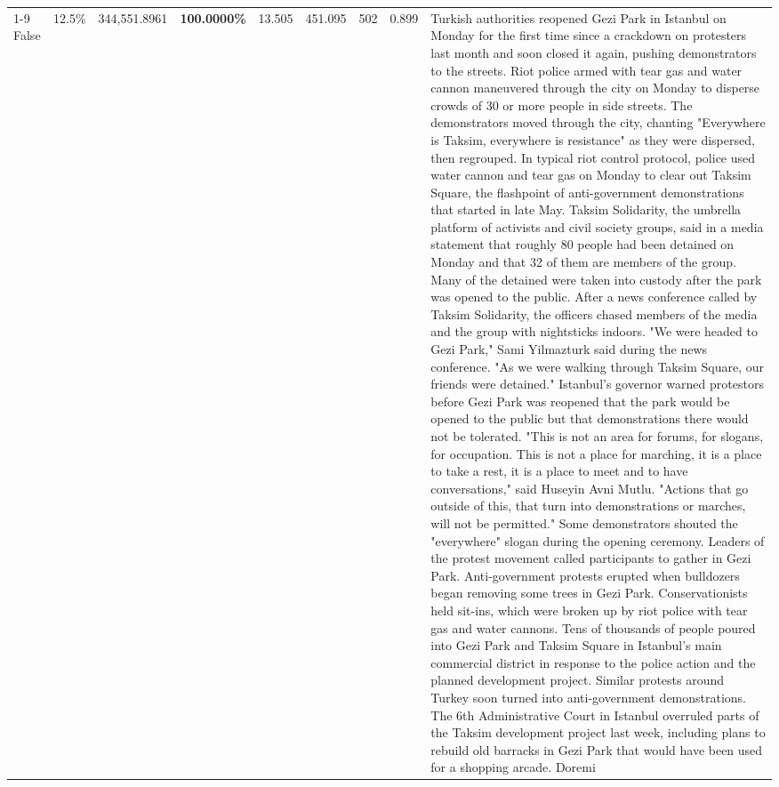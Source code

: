 \begin{table}[H]
\begin{tabular}{lllrlllll}
\cline{1-9}
False & 12.5\% & 344,551.8961 & \bfseries \color{red} 100.0000\% & 13.505 & 451.095 & 502 & 0.899 & Turkish authorities reopened Gezi Park in Istanbul on Monday for the first time since a crackdown on protesters last month and soon closed it again, pushing demonstrators to the streets. Riot police armed with tear gas and water cannon maneuvered through the city on Monday to disperse crowds of 30 or more people in side streets. The demonstrators moved through the city, chanting "Everywhere is Taksim, everywhere is resistance" as they were dispersed, then regrouped. In typical riot control protocol, police used water cannon and tear gas on Monday to clear out Taksim Square, the flashpoint of anti-government demonstrations that started in late May. Taksim Solidarity, the umbrella platform of activists and civil society groups, said in a media statement that roughly 80 people had been detained on Monday and that 32 of them are members of the group. Many of the detained were taken into custody after the park was opened to the public. After a news conference called by Taksim Solidarity, the officers chased members of the media and the group with nightsticks indoors. "We were headed to Gezi Park," Sami Yilmazturk said during the news conference. "As we were walking through Taksim Square, our friends were detained." Istanbul's governor warned protestors before Gezi Park was reopened that the park would be opened to the public but that demonstrations there would not be tolerated. "This is not an area for forums, for slogans, for occupation. This is not a place for marching, it is a place to take a rest, it is a place to meet and to have conversations," said Huseyin Avni Mutlu. "Actions that go outside of this, that turn into demonstrations or marches, will not be permitted." Some demonstrators shouted the "everywhere" slogan during the opening ceremony. Leaders of the protest movement called participants to gather in Gezi Park. Anti-government protests erupted when bulldozers began removing some trees in Gezi Park. Conservationists held sit-ins, which were broken up by riot police with tear gas and water cannons. Tens of thousands of people poured into Gezi Park and Taksim Square in Istanbul's main commercial district in response to the police action and the planned development project. Similar protests around Turkey soon turned into anti-government demonstrations. The 6th Administrative Court in Istanbul overruled parts of the Taksim development project last week, including plans to rebuild old barracks in Gezi Park that would have been used for a shopping arcade. Doremi \\

\end{tabular}
\end{table}
